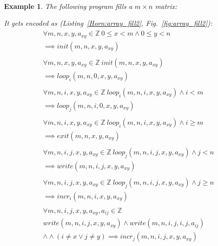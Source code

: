 \documentclass[a4paper]{article}
\newcommand{\ZZ}{\mathbb{Z}}
\theoremstyle{definition}
\theoremstyle{plain}
\newtheorem{example}{Example}
\newcommand{\rulespacing}{\\[0.4em]}
\begin{document}
\begin{example}
The following program fills a $m \times n$ matrix:


It gets encoded as (Listing~\ref{Horn:array_fill2}, Fig.~\ref{fig:array_fill2}):
{\small\begin{align}
\begin{aligned}
\forall m,n,x,y,a_{xy} \in \ZZ~
  0 \leq x < m \land 0 \leq y < n \\ \implies
  \mathit{init}(m, n, x, y, a_{xy})
\end{aligned}\rulespacing
\begin{aligned}
\forall m,n,x,y,a_{xy} \in \ZZ~
  \mathit{init}(m, n, x, y, a_{xy}) \\ \implies
  \mathit{loop}_i(m, n, 0, x, y, a_{xy})
\end{aligned}\rulespacing
\begin{aligned}
\forall m,n,i,x,y,a_{xy} \in \ZZ~
  \mathit{loop}_i(m, n, i, x, y, a_{xy}) \land i<m \\ \implies
  \mathit{loop}_j(m, n, i, 0, x, y, a_{xy})
\end{aligned}\rulespacing
\begin{aligned}
\forall m,n,i,x,y,a_{xy} \in \ZZ~
  \mathit{loop}_i(m, n, i, x, y, a_{xy}) \land i\geq m \\ \implies
  \mathit{exit}(m, n, x, y, a_{xy})
\end{aligned}\rulespacing
\begin{aligned}
\forall m,n,i,j,x,y,a_{xy} \in \ZZ~
  \mathit{loop}_j(m, n, i, j, x, y, a_{xy}) \land j<n \\ \implies
  \mathit{write}(m, n, i, j, x, y, a_{xy})
\end{aligned}\rulespacing
\begin{aligned}
\forall m,n,i,j,x,y,a_{xy} \in \ZZ~
  \mathit{loop}_j(m, n, i, j, x, y, a_{xy}) \land j\geq n \\ \implies
  \mathit{incr}_i(m, n, i, x, y, a_{xy})
\end{aligned}\rulespacing
\begin{aligned}
\forall m,n,i,j,x,y,a_{xy},a_{ij} \in \ZZ \\
  \mathit{write}(m, n, i, j, x, y, a_{xy})  \land
  \mathit{write}(m, n, i, j, i, j, a_{ij}) \\ \land
  \land (i\neq x \lor j\neq y) \implies
  \mathit{incr}_j(m, n, i, j, x, y, a_{xy})
\end{aligned}\rulespacing

\end{align}}
\end{example}
\end{document}

